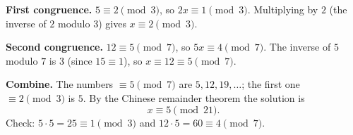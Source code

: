 \textbf{First congruence.} $5\equiv2\pmod3$, so $2x\equiv1\pmod3$. Multiplying by $2$ (the inverse of $2$ modulo $3$) gives $x\equiv2\pmod3$.

\textbf{Second congruence.} $12\equiv5\pmod7$, so $5x\equiv4\pmod7$. The inverse of $5$ modulo $7$ is $3$ (since $15\equiv1$), so $x\equiv12\equiv5\pmod7$.

\textbf{Combine.} The numbers $\equiv5\pmod7$ are $5,12,19,\dots$; the first one $\equiv2\pmod3$ is $5$. By the Chinese remainder theorem the solution is
\[
\boxed{x\equiv5\pmod{21}}.
\]
Check: $5\cdot5=25\equiv1\pmod3$ and $12\cdot5=60\equiv4\pmod7$.
